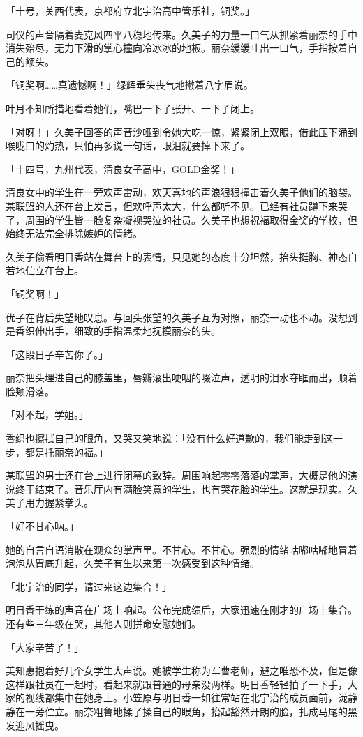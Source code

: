 \documentclass[UTF8]{ctexart}
\begin{document}
    「十号，关西代表，京都府立北宇治高中管乐社，铜奖。」 

    司仪的声音隔着麦克风四平八稳地传来。久美子的力量一口气从抓紧着丽奈的手中消失殆尽，无力下滑的掌心撞向冷冰冰的地板。丽奈缓缓吐出一口气，手指按着自己的额头。 

    「铜奖啊……真遗憾啊！」绿辉垂头丧气地撇着八字眉说。 

    叶月不知所措地看着她们，嘴巴一下子张开、一下子闭上。 

    「对呀！」久美子回答的声音沙哑到令她大吃一惊，紧紧闭上双眼，借此压下涌到喉咙口的灼热，只怕再多说一句话，眼泪就要掉下来了。 

    「十四号，九州代表，清良女子高中，GOLD金奖！」 

    清良女中的学生在一旁欢声雷动，欢天喜地的声浪狠狠撞击着久美子他们的脑袋。某联盟的人还在台上发言，但欢呼声太大，什么都听不见。已经有社员蹲下来哭了，周围的学生皆一脸复杂凝视哭泣的社员。久美子也想祝福取得金奖的学校，但始终无法完全排除嫉妒的情绪。 

    久美子偷看明日香站在舞台上的表情，只见她的态度十分坦然，抬头挺胸、神态自若地伫立在台上。 

    「铜奖啊！」 

    优子在背后失望地叹息。与回头张望的久美子互为对照，丽奈一动也不动。没想到是香织伸出手，细致的手指温柔地抚摸丽奈的头。 

    「这段日子辛苦你了。」 

    丽奈把头埋进自己的膝盖里，唇瓣滚出哽咽的啜泣声，透明的泪水夺眶而出，顺着脸颊滑落。 

    「对不起，学姐。」 

    香织也擦拭自己的眼角，又哭又笑地说：「没有什么好道歉的，我们能走到这一步，都是托丽奈的福。」 

    某联盟的男士还在台上进行闭幕的致辞。周围响起零零落落的掌声，大概是他的演说终于结束了。音乐厅内有满脸笑意的学生，也有哭花脸的学生。这就是现实。久美子用力握紧拳头。 

    「好不甘心呐。」 

    她的自言自语消散在观众的掌声里。不甘心。不甘心。强烈的情绪咕嘟咕嘟地冒着泡泡从胃底升起，久美子有生以来第一次感受到这种情绪。 

    「北宇治的同学，请过来这边集合！」 

    明日香干练的声音在广场上响起。公布完成绩后，大家迅速在刚才的广场上集合。还有些三年级在哭，其他人则拼命安慰她们。 

    「大家辛苦了！」 

    美知惠抱着好几个女学生大声说。她被学生称为军曹老师，避之唯恐不及，但是像这样跟社员在一起时，看起来就跟普通的母亲没两样。明日香轻轻拍了一下手，大家的视线都集中在她身上。小笠原与明日香一如往常站在北宇治的成员面前，泷静静在一旁伫立。丽奈粗鲁地揉了揉自己的眼角，抬起豁然开朗的脸，扎成马尾的黑发迎风摇曳。 
\end{document}
